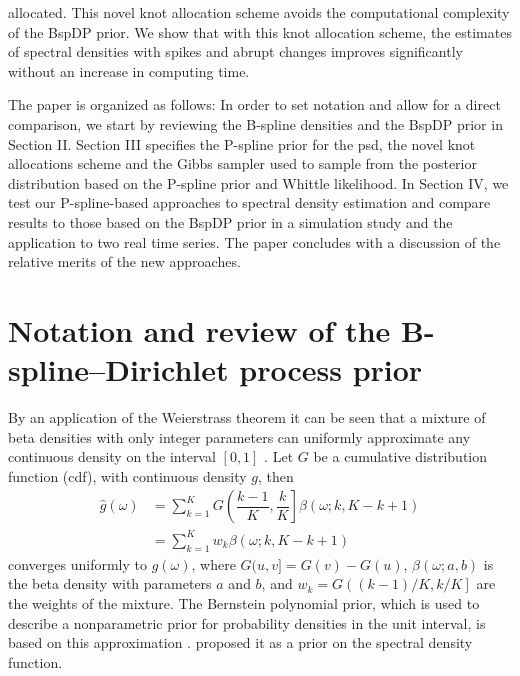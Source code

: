 \documentclass[twocolumn,final]{svjour3}
\begin{document}
allocated. This novel knot allocation scheme avoids the computational complexity of the BspDP prior.  We show that with this knot allocation scheme, the estimates of spectral densities with spikes and abrupt changes improves significantly without an increase in computing time.



The paper is organized as follows: In order to set notation and allow for a direct comparison, we start by
reviewing the B-spline densities and the BspDP prior in Section II. Section III specifies the P-spline prior for the psd, the novel knot allocations scheme and the Gibbs sampler used to sample from the posterior distribution based on the P-spline prior and Whittle likelihood.  In Section IV, we test our P-spline-based approaches to spectral density estimation and compare results to those based on the BspDP prior in a simulation study and the application to two real time series. The paper concludes with a discussion of the relative merits of the new approaches.

\section{Notation and review of the B-spline--Dirichlet process prior}

By an application of the Weierstrass theorem it can be seen that a mixture of beta densities with only integer parameters can uniformly approximate any continuous density  on the interval $[0,1]$ \citep{Choudhuri:2004}.  Let $G$ be a cumulative distribution function (cdf), with continuous density $g$, then 
\begin{align}
\label{eq:Bernstein}
\widehat{g}(\omega) &= \sum_{k=1}^{K} G \left( \dfrac{k-1}{K} , \dfrac{k}{K} \right] \beta(\omega; k, K-k+1)\\
&= \sum_{k=1}^{K} w_k \beta(\omega; k, K-k+1)
\end{align}	  
converges uniformly to $g(\omega)$, where $G(u,v] = G(v) - G(u)$, $\beta(\omega; a,b)$ is the beta density with parameters $a$ and $b$, and $w_k=G\left((k-1)/K, k/K \right]$ are the weights of the mixture.
The Bernstein polynomial prior, which is used to describe a nonparametric prior for probability densities in the unit interval, is based on this approximation \citep{Petrone:1999a,Petrone:199b}.  \cite{Choudhuri:2004} proposed it as a prior on the spectral density function.
\end{document}
